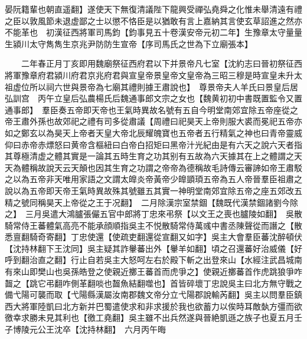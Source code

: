 晏阮籍輩也朝直遥翻】遂使天下無復清議陛下龍興受禪弘堯舜之化惟未舉清遠有禮之臣以敦風節未退虚鄙之士以懲不恪臣是以猶敢有言上嘉納其言使玄草詔進之然亦不能革也　初漢征西將軍司馬鈞【鈞事見五十卷漢安帝元初二年】生豫章太守量量生潁川太守雋雋生京兆尹防防生宣帝【序司馬氏之世為下立廟張本】

　　二年春正月丁亥即用魏廟祭征西府君以下并景帝凡七室【沈約志曰晉初祭征西將軍豫章府君潁川府君京兆府君與宣皇帝景皇帝文皇帝為三昭三穆是時宣皇未升太祖虚位所以祠六世與景帝為七廟其禮則據王肅說也】　尊景帝夫人羊氏曰景皇后居弘訓宫　丙午立皇后弘農楊氏后魏通事郎文宗之女也【魏黄初初中書既置監令又置通事郎】　羣臣奏五帝即天帝也王氣時異故名號有五自今明堂南郊宜除五帝座從之帝王肅外孫也故郊祀之禮有司多從肅議【周禮曰祀昊天上帝則服大裘而冕祀五帝亦如之鄭玄以為昊天上帝者天皇大帝北辰耀魄寶也五帝者五行精氣之神也曰青帝靈威仰曰赤帝赤熛怒曰黄帝含樞紐曰白帝白招矩曰黑帝汁光紀由是有六天之說六天者指其尊極清虚之體其實是一論其五時生育之功其别有五故為六天據其在上之體謂之天天為體稱故說天云天顛也因其生育之功謂之帝帝為德稱故毛詩傳云審諦如帝王肅駁之以為五帝非天唯用家語之文謂太皥炎帝黃帝少皥顗頊五帝為五人帝晉羣臣祖肅之說以為五帝即天帝王氣時異故殊其號雖五其實一神明堂南郊宜除五帝之座五郊改五精之號同稱昊天上帝從之王于况翻】　二月除漢宗室禁錮【魏既代漢禁錮諸劉今除之】　三月吳遣大鴻臚張儼五官中郎將丁忠來弔祭【以文王之喪也臚陵如翻】　吳散騎常侍王蕃體氣高亮不能承顔順指吳主不悦散騎常侍萬彧中書丞陳聲從而譖之【散悉亶翻騎奇寄翻】丁忠使還【使疏吏翻還從宣翻又如字】吳主大會羣臣蕃沈醉頓伏【沈持林翻下王沈同】吳主疑其詐轝蕃出外【轝羊如翻】頃之召還蕃好治威儀【好呼到翻治直之翻】行止自若吳主大怒呵左右於殿下斬之出登來山【水經注武昌城南有來山即樊山也吳孫皓登之使親近擲王蕃首而虎爭之】使親近擲蕃首作虎跳狼爭咋齧之【跳它弔翻咋側革翻啖也齧魚結翻噬也】首皆碎壞丁忠說吳主曰北方無守戰之備弋陽可襲而取【弋陽縣漢屬汝南郡魏文帝分立弋陽郡說輸芮翻】吳主以問羣臣鎮西大將軍陸凱曰北方新并巴蜀遣使求和非求援於我也欲蓄力以俟時耳敵埶方彊而欲徼幸求勝未見其利也【徼工堯翻】吳主雖不出兵然遂與晉絶凱遜之族子也夏五月壬子博陵元公王沈卒【沈持林翻】　六月丙午晦

